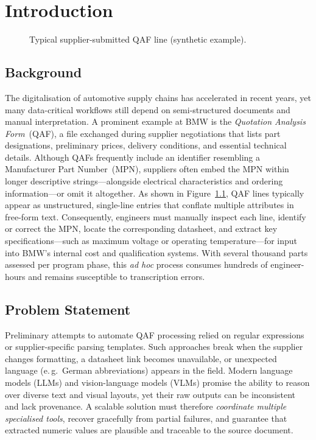 \chapter{Introduction}\label{chapter:introduction}

\begin{figure}[H]
  \centering
  \caption{Typical supplier-submitted QAF line (synthetic example).}
  \label{fig:qaf-line-example}
\end{figure}

\section{Background }
The digitalisation of automotive supply chains has accelerated in recent years, yet many data-critical workflows still depend on semi-structured documents and manual interpretation.  
A prominent example at BMW is the \emph{Quotation Analysis Form}~(QAF), a file exchanged during supplier negotiations that lists part designations, preliminary prices, delivery conditions, and essential technical details.  
Although QAFs frequently include an identifier resembling a Manufacturer Part Number~(MPN), suppliers often embed the MPN within longer descriptive strings—alongside electrical characteristics and ordering information—or omit it altogether.  
As shown in Figure~\ref{fig:qaf-line-example}, QAF lines typically appear as unstructured, single-line entries that conflate multiple attributes in free-form text.  
Consequently, engineers must manually inspect each line, identify or correct the MPN, locate the corresponding datasheet, and extract key specifications—such as maximum voltage or operating temperature—for input into BMW’s internal cost and qualification systems.  
With several thousand parts assessed per program phase, this \emph{ad hoc} process consumes hundreds of engineer-hours and remains susceptible to transcription errors.

\section{Problem Statement}
Preliminary attempts to automate QAF processing relied on regular expressions or supplier-specific parsing templates.  
Such approaches break when the supplier changes formatting, a datasheet link becomes unavailable, or unexpected language (e.\,g.\ German abbreviations) appears in the field.  
Modern language models (LLMs) and vision-language models (VLMs) promise the ability to reason over diverse text and visual layouts, yet their raw outputs can be inconsistent and lack provenance.  
A scalable solution must therefore \emph{coordinate multiple specialised tools}, recover gracefully from partial failures, and guarantee that extracted numeric values are plausible and traceable to the source document.

